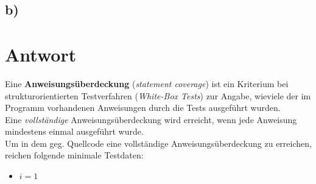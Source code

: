\subsection*{b)}

\section*{Antwort}

Eine \textbf{Anweisungsüberdeckung} (\textit{statement coverage}) ist ein Kriterium bei strukturorientierten Testverfahren (\textit{White-Box Tests}) zur Angabe, wieviele der im Programm vorhandenen Anweisungen durch die Tests ausgeführt wurden.\\
Eine \textit{vollständige} Anweisungsüberdeckung wird erreicht, wenn jede Anweisung mindestens einmal ausgeführt wurde.\\

\noindent
Um in dem geg. Quellcode eine vollständige Anweisungsüberdeckung zu erreichen, reichen folgende minimale Testdaten:

\begin{itemize}
    \item $i=1$
\end{itemize}